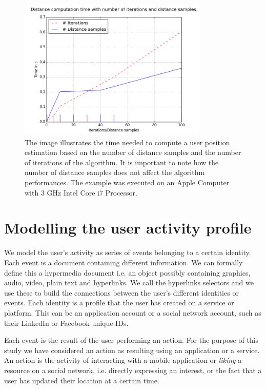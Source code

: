 \begin{figure}[t]
\centering
\includegraphics[width=90mm]{figures/figure_time.png}
\caption[Computational time needed to estimate a user position.]{The image illustrates the time needed to compute a user position estimation based on the number of distance samples and the number of iterations of the algorithm. It is important to note how the number of distance samples does not affect the algorithm performances. The example was executed on an Apple Computer with 3 GHz Intel Core i7 Processor.
\label{fig:comp_time}}
\end{figure}

\section{Modelling the user activity profile}
\label{sec:activity-profile}
\noindent
We model the user's activity as series of events belonging to a certain identity. Each event is a document containing different information. We can formally define this a hypermedia document i.e. an object possibly containing graphics, audio, video, plain text and hyperlinks. We call the hyperlinks selectors and we use these to build the connections between the user's different identities or events. Each identity is a profile that the user has created on a service or platform. This can be an application account or a social network account, such as their LinkedIn or Facebook unique IDs.

Each event is the result of the user performing an action. For the purpose of this study we have considered an action as resulting using an application or a service. An action is the activity of interacting with a mobile application or \emph{liking} a resource on a social network, i.e. directly expressing an interest, or the fact that a user has updated their location at a certain time.

